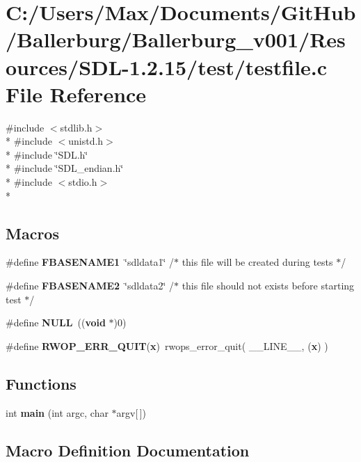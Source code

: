 \section{C\+:/\+Users/\+Max/\+Documents/\+Git\+Hub/\+Ballerburg/\+Ballerburg\+\_\+v001/\+Resources/\+S\+D\+L-\/1.2.15/test/testfile.c File Reference}
\label{testfile_8c}
{\ttfamily \#include $<$stdlib.\+h$>$}\\*
{\ttfamily \#include $<$unistd.\+h$>$}\\*
{\ttfamily \#include \char`\"{}S\+D\+L.\+h\char`\"{}}\\*
{\ttfamily \#include \char`\"{}S\+D\+L\+\_\+endian.\+h\char`\"{}}\\*
{\ttfamily \#include $<$stdio.\+h$>$}\\*
\subsection*{Macros}
\begin{DoxyCompactItemize}
\item 
\#define {\bf F\+B\+A\+S\+E\+N\+A\+M\+E1}~\char`\"{}sdldata1\char`\"{}		/$\ast$ this file will be created during tests $\ast$/
\item 
\#define {\bf F\+B\+A\+S\+E\+N\+A\+M\+E2}~\char`\"{}sdldata2\char`\"{}		/$\ast$ this file should not exists before starting test $\ast$/
\item 
\#define {\bf N\+U\+L\+L}~(({\bf void} $\ast$)0)
\item 
\#define {\bf R\+W\+O\+P\+\_\+\+E\+R\+R\+\_\+\+Q\+U\+I\+T}({\bf x})~rwops\+\_\+error\+\_\+quit( \+\_\+\+\_\+\+L\+I\+N\+E\+\_\+\+\_\+, ({\bf x}) )
\end{DoxyCompactItemize}
\subsection*{Functions}
\begin{DoxyCompactItemize}
\item 
int {\bf main} (int argc, char $\ast$argv[$\,$])
\end{DoxyCompactItemize}


\subsection{Macro Definition Documentation}
